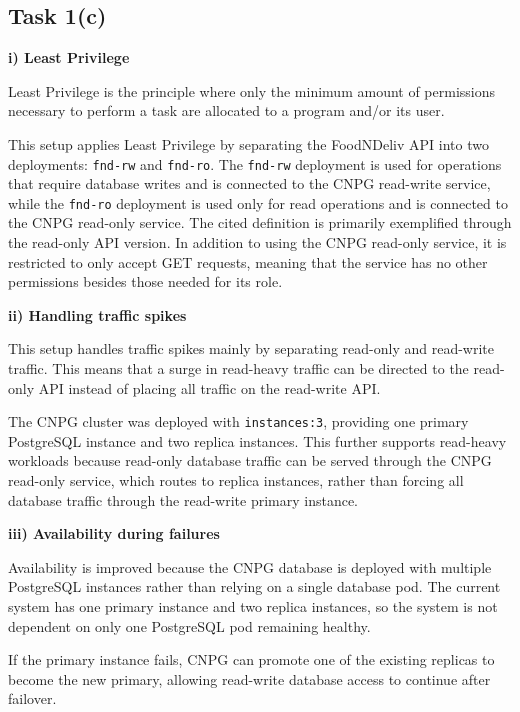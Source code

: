 \documentclass[11pt,a4paper]{article}
\begin{document}
	\subsection{Task 1(c)}
	
	\textbf{i) Least Privilege}
	
	Least Privilege is the principle where only the minimum amount of permissions necessary to perform a task are allocated to a program and/or its user.\cite{Least Privilege and More Fred B. Schneider}
	
	This setup applies Least Privilege by separating the FoodNDeliv API into two deployments: \texttt{fnd-rw} and \texttt{fnd-ro}. The \texttt{fnd-rw} deployment is used for operations that require database writes and is connected to the CNPG read-write service, while the \texttt{fnd-ro} deployment is used only for read operations and is connected to the CNPG read-only service. The cited definition is primarily exemplified through the read-only API  version. In addition to using the CNPG read-only service, it is restricted to only accept GET requests, meaning that the service has no other permissions besides those needed for its role.
	
	\textbf{ii) Handling traffic spikes}
	
	This setup handles traffic spikes mainly by separating read-only and read-write traffic. This means that a surge in read-heavy traffic can be directed to the read-only API instead of placing all traffic on the read-write API.
	
	The CNPG cluster was deployed with \texttt{instances:3}, providing one primary PostgreSQL instance and two replica instances. This further supports read-heavy workloads because read-only database traffic can be served through the CNPG read-only service, which routes to replica instances, rather than forcing all database traffic through the read-write primary instance.
	
	\textbf{iii) Availability during failures}
	
	Availability is improved because the CNPG database is deployed with multiple PostgreSQL instances rather than relying on a single database pod. The current system has one primary instance and two replica instances, so the system is not dependent on only one PostgreSQL pod remaining healthy.
	
	If the primary instance fails, CNPG can promote one of the existing replicas to become the new primary, allowing read-write database access to continue after failover. 
	
\end{document}
